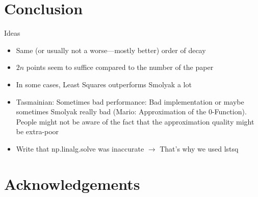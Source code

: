 \documentclass[12pt, oneside]{amsart}
\theoremstyle{definition}
\theoremstyle{remark}
\numberwithin{equation}{section}
\begin{document}
\begin{table}[H]
	\centering
	\begin{adjustbox}{width=\linewidth}
		
	\end{adjustbox}
	\caption{}
	\label{tab:zhou_results}
\end{table}


\newpage

\section{Conclusion}\label{sec:conclusion}


Ideas
\begin{itemize}
	\item Same (or usually not a worse---mostly better) order of decay
	\item $2n$ points seem to suffice compared to the number of the paper
	\item In some cases, Least Squares outperforms Smolyak a lot
	\item Tasmainian: Sometimes bad performance: Bad implementation or maybe 
	sometimes Smolyak really bad (Mario: Approximation of the $0$-Function). 
	People 
	might not be aware of the fact that the approximation quality might be 
	extra-poor
	\item Write that np.linalg.solve was inaccurate $\rightarrow$ That's why we 
	used lstsq
\end{itemize}

\section*{Acknowledgements}





\newpage

\nocite{*}
\printbibliography

\vspace{\fill}

\noindent
\address{J.E., Johannes Kepler University Linz; 
	\texttt{jakob.eggl@jku.at}; \\
	E.M., Johannes Kepler University Linz; 
	\texttt{elias.mindlberger@jku.at}; \\
	M.U., Johannes Kepler University Linz; 
	\texttt{mario.ullrich@jku.at}
}
\end{document}
